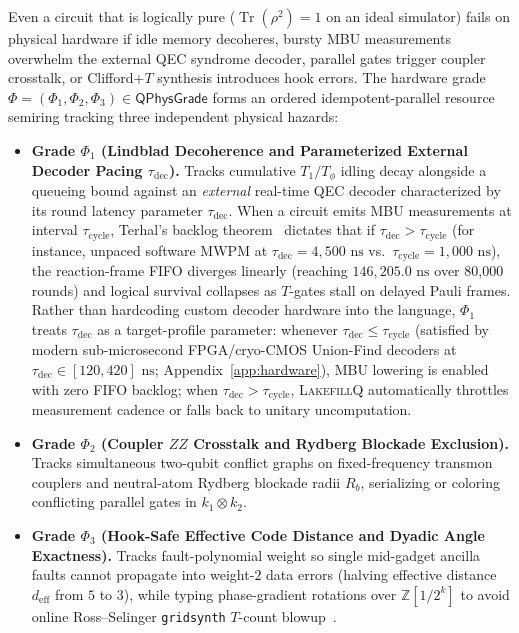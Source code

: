 \documentclass[acmsmall,screen,anonymous]{acmart}
\DeclareRobustCommand{\_}{\ifmmode\text{\char95}\else\char95\penalty0\relax\fi}
\theoremstyle{plain}
\newcommand{\LakefillQ}{\textsc{LakefillQ}}
\newcommand{\QPhysGrade}{\ensuremath{\mathsf{QPhysGrade}}}
\begin{document}
Even a circuit that is logically pure ($\operatorname{Tr}(\rho^2) = 1$ on an ideal simulator) fails on physical hardware if idle memory decoheres, bursty MBU measurements overwhelm the external QEC syndrome decoder, parallel gates trigger coupler crosstalk, or Clifford+$T$ synthesis introduces hook errors. The hardware grade $\Phi = (\Phi_1, \Phi_2, \Phi_3) \in \QPhysGrade$ forms an ordered idempotent-parallel resource semiring tracking three independent physical hazards:
\begin{itemize}
  \item \textbf{Grade $\Phi_1$ (Lindblad Decoherence and Parameterized External Decoder Pacing $\tau_{\mathrm{dec}}$).} Tracks cumulative $T_1/T_\phi$ idling decay alongside a queueing bound against an \emph{external} real-time QEC decoder characterized by its round latency parameter $\tau_{\mathrm{dec}}$. When a circuit emits MBU measurements at interval $\tau_{\mathrm{cycle}}$, Terhal's backlog theorem~\cite{terhal2015} dictates that if $\tau_{\mathrm{dec}} > \tau_{\mathrm{cycle}}$ (for instance, unpaced software MWPM at $\tau_{\mathrm{dec}} = 4{,}500\text{ ns}$ vs.\ $\tau_{\mathrm{cycle}} = 1{,}000\text{ ns}$), the reaction-frame FIFO diverges linearly (reaching $146{,}205.0\text{ ns}$ over 80,000 rounds) and logical survival collapses as $T$-gates stall on delayed Pauli frames. Rather than hardcoding custom decoder hardware into the language, $\Phi_1$ treats $\tau_{\mathrm{dec}}$ as a target-profile parameter: whenever $\tau_{\mathrm{dec}} \le \tau_{\mathrm{cycle}}$ (satisfied by modern sub-microsecond FPGA/cryo-CMOS Union-Find decoders at $\tau_{\mathrm{dec}} \in [120, 420]\text{ ns}$; Appendix~\ref{app:hardware}), MBU lowering is enabled with zero FIFO backlog; when $\tau_{\mathrm{dec}} > \tau_{\mathrm{cycle}}$, \LakefillQ{} automatically throttles measurement cadence or falls back to unitary uncomputation.
  \item \textbf{Grade $\Phi_2$ (Coupler $ZZ$ Crosstalk and Rydberg Blockade Exclusion).} Tracks simultaneous two-qubit conflict graphs on fixed-frequency transmon couplers and neutral-atom Rydberg blockade radii $R_b$, serializing or coloring conflicting parallel gates in $k_1 \otimes k_2$.
  \item \textbf{Grade $\Phi_3$ (Hook-Safe Effective Code Distance and Dyadic Angle Exactness).} Tracks fault-polynomial weight so single mid-gadget ancilla faults cannot propagate into weight-$2$ data errors (halving effective distance $d_{\mathrm{eff}}$ from $5$ to $3$), while typing phase-gradient rotations over $\mathbb{Z}[1/2^k]$ to avoid online Ross--Selinger \texttt{gridsynth} $T$-count blowup~\cite{ross2016}.
\end{itemize}
\end{document}
